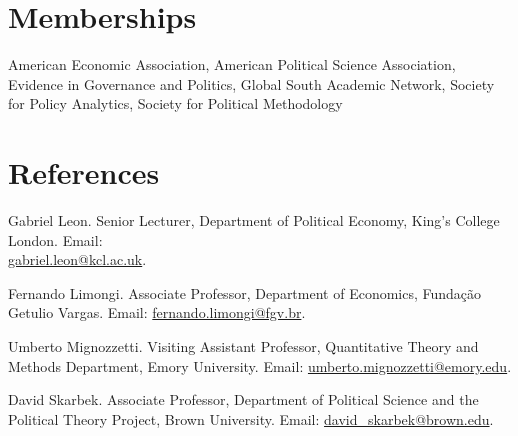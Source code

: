 \documentclass[a4paper]{article}
\renewenvironment{itemize}{
	\begin{list}{}{
			\setlength{\leftmargin}{1.5em}
		}
		}{
	\end{list}
}
\begin{document}
\section*{Memberships}

\begin{itemize}
\item American Economic Association, American Political Science Association, Evidence in Governance and Politics, Global South Academic Network, Society for Policy Analytics, Society for Political Methodology
\end{itemize}

\section*{References}

\begin{itemize}

\item Gabriel Leon. Senior Lecturer, Department of Political Economy, King's College London. Email: \\ \href{mailto:gabriel.leon@kcl.ac.uk}{gabriel.leon@kcl.ac.uk}.
\item Fernando Limongi. Associate Professor, Department of Economics, Fundação Getulio Vargas. Email: \href{mailto:fernando.limongi@fgv.br}{fernando.limongi@fgv.br}.
\item Umberto Mignozzetti. Visiting Assistant Professor, Quantitative Theory and Methods Department, Emory University. Email: \href{mailto:umberto.mignozzetti@emory.edu}{umberto.mignozzetti@emory.edu}.
\item David Skarbek. Associate Professor, Department of Political Science and the Political Theory Project, Brown University. Email: \href{mailto:davidskarbek@gmail.com}{david\_skarbek@brown.edu}.
\end{itemize}

	\bigskip


	
\end{document}
